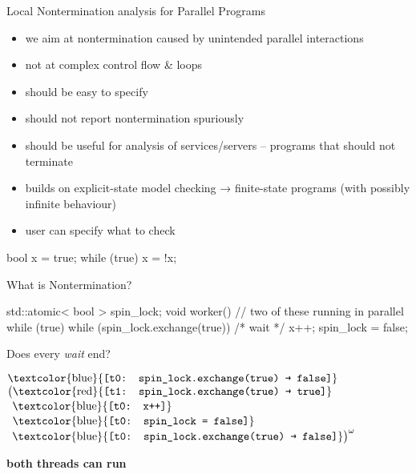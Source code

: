 \documentclass[aspectratio=169, fi]{paradise-slide}
\begin{document}
\begin{frame}[fragile]{Local Nontermination analysis for Parallel Programs}
  \setlength{\leftmargini}{1em}
  \begin{itemize}
    \item we aim at nontermination caused by unintended parallel interactions \pause
    \item not at complex control flow \& loops \pause
    \item should be easy to specify
    \item should not report nontermination spuriously
    \item should be useful for analysis of services/servers – programs that should not terminate
  \pause
  \bigskip
    \item builds on explicit-state model checking → finite-state programs (with possibly infinite behaviour)
    \item user can specify what to check
  \end{itemize}

  \bigskip
  \begin{minipage}{0.49\textwidth}
    \begin{cppcode}
      bool x = true;
      while (true) { x = !x; }
    \end{cppcode}
  \end{minipage}
  \hfill
  \begin{minipage}{0.49\textwidth}
  \end{minipage}
\end{frame}

\begin{frame}[fragile]{What is Nontermination?}
  \begin{cppcode}
  std::atomic< bool > spin_lock;
  void worker() { // two of these running in parallel
      while (true) {
          while (spin_lock.exchange(true)) { /* wait */ }
          x++;
          spin_lock = false;
      }
  }
  \end{cppcode}

  Does every \emph{wait} end? \pause

  \bigskip
  \newcommand{\ta}[1]{\text{\textcolor{blue}{\texttt{[t0: #1]}}}}
  \newcommand{\tb}[1]{\text{\textcolor{red}{\texttt{[t1: #1]}}}}
  $\ta{spin\_lock.exchange(true) \textrightarrow{} false}$\\
  $\big(\tb{spin\_lock.exchange(true) \textrightarrow{} true}$\\
  $\phantom{\big(}\ta{x++}$\\
  $\phantom{\big(}\ta{spin\_lock = false}$\\
  $\phantom{\big(}\ta{spin\_lock.exchange(true) \textrightarrow{} false}\big)^\omega$

  \medskip
  \textbf{both threads can run}
\end{frame}
\end{document}
